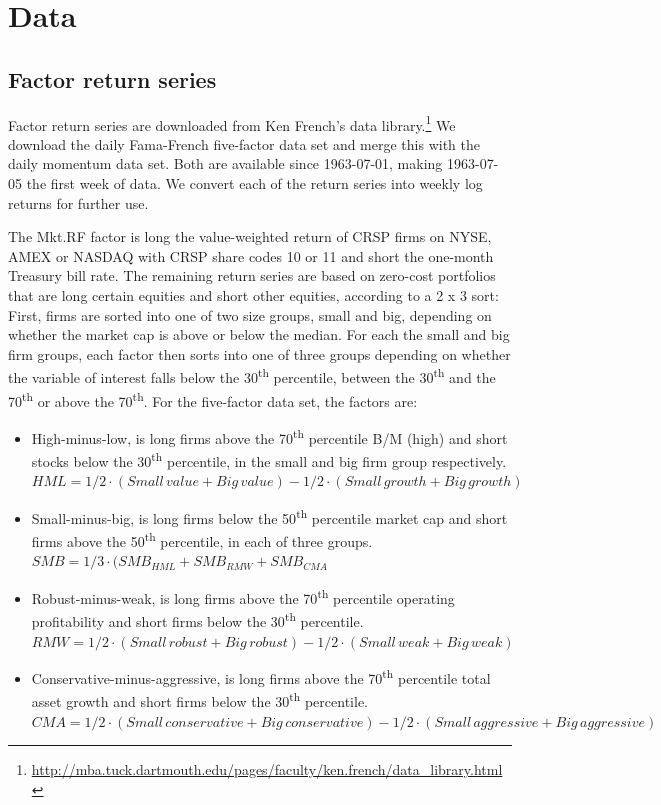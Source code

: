 \section{Data}
\subsection{Factor return series}
Factor return series are downloaded from Ken French's data library.\footnote{\url{http://mba.tuck.dartmouth.edu/pages/faculty/ken.french/data_library.html}} We download the daily Fama-French five-factor data set and merge this with the daily momentum data set. Both are available since 1963-07-01, making 1963-07-05 the first week of data. We convert each of the return series into weekly log returns for further use. 

The Mkt.RF factor is long the value-weighted return of CRSP firms on NYSE, AMEX or NASDAQ with CRSP share codes 10 or 11 and short the one-month Treasury bill rate. The remaining return series are based on zero-cost portfolios that are long certain equities and short other equities, according to a 2 x 3 sort: First, firms are sorted into one of two size groups, small and big, depending on whether the market cap is above or below the median. For each the small and big firm groups, each factor then sorts into one of three groups depending on whether the variable of interest falls below the 30\textsuperscript{th} percentile, between the 30\textsuperscript{th} and the 70\textsuperscript{th} or above the 70\textsuperscript{th}. For the five-factor data set, the factors are:
\begin{itemize}
  \item High-minus-low, is long firms above the 70\textsuperscript{th} percentile B/M (high) and short stocks below the 30\textsuperscript{th} percentile, in the small and big firm group respectively. \\
  $HML = 1/2 \cdot (Small\,value + Big\,value) - 1/2 \cdot (Small\,growth + Big\,growth)$
  \item Small-minus-big, is long firms below the 50\textsuperscript{th} percentile market cap and short firms above the 50\textsuperscript{th} percentile, in each of three groups. \\
  $SMB = 1/3 \cdot (SMB_{HML} + SMB_{RMW} + SMB_{CMA}$
  \item Robust-minus-weak, is long firms above the 70\textsuperscript{th} percentile operating profitability and short firms below the 30\textsuperscript{th} percentile. \\
  $RMW = 1/2 \cdot (Small\,robust + Big\,robust) - 1/2 \cdot (Small\,weak + Big\,weak)$
  \item Conservative-minus-aggressive, is long firms above the 70\textsuperscript{th} percentile total asset growth and short firms below the 30\textsuperscript{th} percentile. \\
  $CMA = 1/2 \cdot (Small\,conservative + Big\,conservative) - 1/2 \cdot (Small\,aggressive + Big\,aggressive)$
\end{itemize}
